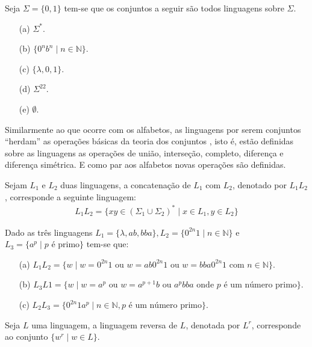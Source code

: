 \begin{example}
	Seja $\Sigma = \{0, 1\}$ tem-se que os conjuntos a seguir são todos linguagens sobre $\Sigma$.
	\begin{itemize}
		\item[(a)] $\Sigma^*$.
		\item[(b)] $\{0^nb^n \mid n \in \mathbb{N}\}$.
		\item[(c)] $\{\lambda, 0, 1\}$.
		\item[(d)] $\Sigma^{22}$.
		\item[(e)] $\emptyset$.
	\end{itemize}
\end{example}

Similarmente ao que ocorre com os alfabetos, as linguagens por serem conjuntos ``herdam'' as operações básicas da teoria dos conjuntos \cite{lipschutz1978-TC, lipschutz2013-MD, abe1991-TC}, isto é, estão definidas sobre as linguagens as operações de união, interseção, completo, diferença e diferença simétrica. E como par aos alfabetos novas operações são definidas.

\begin{definition}\label{def:ConcatenacaoLinguagem}
	Sejam $L_1$ e $L_2$ duas linguagens, a concatenação de $L_1$ com $L_2$, denotado por $L_1L_2$, corresponde a seguinte linguagem:
	\begin{eqnarray}
		L_1L_2 = \{xy \in (\Sigma_1 \cup \Sigma_2)^* \mid x \in L_1, y \in L_2\}
	\end{eqnarray}
\end{definition}

\begin{example}\label{exe:ConcatenacaoLinguagem} 
	Dado as três linguagens $L_1 = \{\lambda, ab, bba\}, L_2 =\{0^{2n}1 \mid n \in \mathbb{N}\}$ e $L_3 = \{a^p \mid p \text{ é primo}\}$ tem-se que:
	\begin{itemize}
		\item[(a)] $L_1L_2 = \{w \mid w = 0^{2n}1 \text{ ou } w = ab0^{2n}1 \text{ ou } w = bba0^{2n}1 \text{ com } n \in \mathbb{N}\}$.
		\item[(b)] $L_3L1 = \{w \mid w = a^p \text{ ou } w = a^{p+1}b \text{ ou } a^pbba \text{ onde } p \text{ é um número primo}\}$.
		\item[(c)] $L_2L_3 = \{0^{2n}1a^p \mid n \in \mathbb{N}, p \text{ é um número primo}\}$.
	\end{itemize}
\end{example}

\begin{definition}\label{def:LinguagemReversa}
	Seja $L$ uma linguagem, a linguagem reversa de $L$, denotada por $L^r$, corresponde ao conjunto $\{w^r \mid w \in L\}$.
\end{definition}

